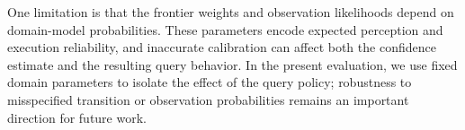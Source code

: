 One limitation is that the frontier weights and observation likelihoods depend on domain-model probabilities. These parameters encode expected perception and execution reliability, and inaccurate calibration can affect both the confidence estimate and the resulting query behavior. In the present evaluation, we use fixed domain parameters to isolate the effect of the query policy; robustness to misspecified transition or observation probabilities remains an important direction for future work.

